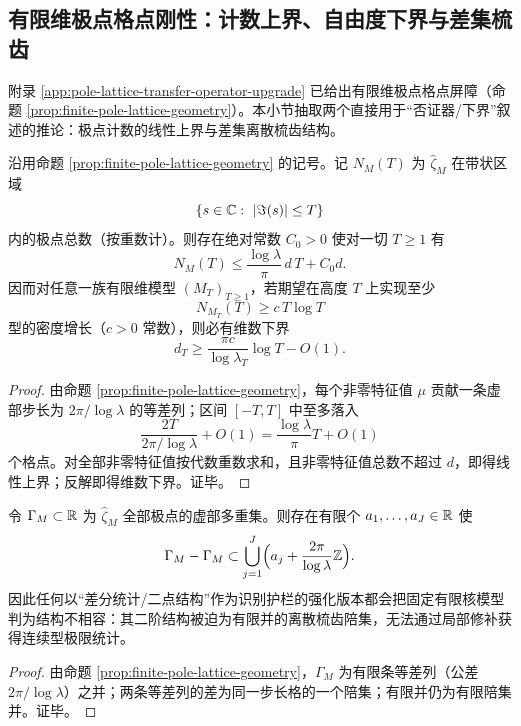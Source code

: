 \subsection{有限维极点格点刚性：计数上界、自由度下界与差集梳齿}\label{subsec:app31-pole-rigidity}

附录 \ref{app:pole-lattice-transfer-operator-upgrade} 已给出有限维极点格点屏障（命题 \ref{prop:finite-pole-lattice-geometry}）。本小节抽取两个直接用于“否证器/下界”叙述的推论：极点计数的线性上界与差集离散梳齿结构。

\begin{theorem}[极点计数的线性上界与维数下界]\label{thm:app31-pole-count-linear}
沿用命题 \ref{prop:finite-pole-lattice-geometry} 的记号。记 $N_M(T)$ 为 $\widehat{\zeta}_M$ 在带状区域
$$
\{s\in\mathbb{C}:\ |\Im(s)|\le T\}
$$
内的极点总数（按重数计）。则存在绝对常数 $C_0>0$ 使对一切 $T\ge 1$ 有
$$
N_M(T)\le \frac{\log\lambda}{\pi}\,d\,T + C_0 d.
$$
因而对任意一族有限维模型 $(M_T)_{T\ge 1}$，若期望在高度 $T$ 上实现至少
$$
N_{M_T}(T)\ge c\,T\log T
$$
型的密度增长（$c>0$ 常数），则必有维数下界
$$
d_T\ge \frac{\pi c}{\log\lambda_T}\log T - O(1).
$$
\end{theorem}

\begin{proof}
由命题 \ref{prop:finite-pole-lattice-geometry}，每个非零特征值 $\mu$ 贡献一条虚部步长为 $2\pi/\log\lambda$ 的等差列；区间 $[-T,T]$ 中至多落入
$$
\frac{2T}{2\pi/\log\lambda}+O(1)=\frac{\log\lambda}{\pi}T+O(1)
$$
个格点。对全部非零特征值按代数重数求和，且非零特征值总数不超过 $d$，即得线性上界；反解即得维数下界。证毕。
\end{proof}

\begin{theorem}[差集离散性与二阶梳齿刚性]\label{thm:app31-difference-set-comb}
令 $\Gamma_M\subset\mathbb{R}$ 为 $\widehat{\zeta}_M$ 全部极点的虚部多重集。则存在有限个 $a_1,\dots,a_J\in\mathbb{R}$ 使
$$
\Gamma_M-\Gamma_M\subset \bigcup_{j=1}^{J}\Bigl(a_j+\frac{2\pi}{\log\lambda}\mathbb{Z}\Bigr).
$$
因此任何以“差分统计/二点结构”作为识别护栏的强化版本都会把固定有限核模型判为结构不相容：其二阶结构被迫为有限并的离散梳齿陪集，无法通过局部修补获得连续型极限统计。
\end{theorem}

\begin{proof}
由命题 \ref{prop:finite-pole-lattice-geometry}，$\Gamma_M$ 为有限条等差列（公差 $2\pi/\log\lambda$）之并；两条等差列的差为同一步长格的一个陪集；有限并仍为有限陪集并。证毕。
\end{proof}

